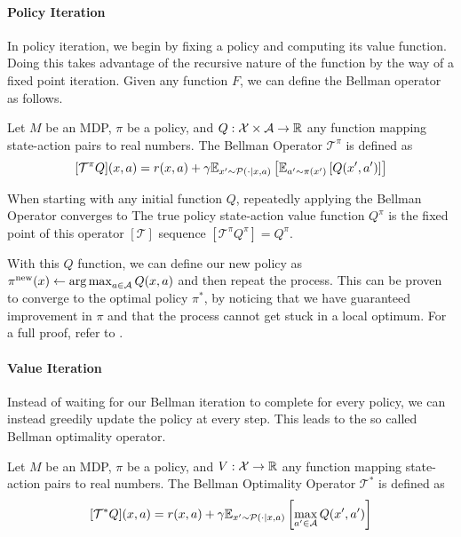 \paragraph{Policy Iteration}

In policy iteration, we begin by fixing a policy and computing its value function.
Doing this takes advantage of the recursive nature of the function by the way of a fixed point iteration.
Given any function $F$, we can define the Bellman operator as follows.

\begin{definition}
    Let $M$ be an MDP, $\pi$ be a policy, and $Q: \mathcal{X} \times \mathcal{A} \rightarrow \mathbb{R}$ any function mapping state-action pairs to real numbers.
    The Bellman Operator $\mathcal{T}^\pi$ is defined as
    $$[\mathcal{T}^\pi Q](x,a) = r(x,a) + \gamma \mathbb{E}_{x'\sim \mathcal{P}(\cdot|x,a)}\left[\mathbb{E}_{a'\sim\pi(x')}\left[Q(x',a')\right]\right]$$
\end{definition}

When starting with any initial function $Q$, repeatedly applying the Bellman Operator converges to 
The true policy state-action value function $Q^\pi$ is the fixed point of this operator $[\mathcal{T}]$ sequence $[\mathcal{T}^\pi Q^\pi] = Q^\pi$.

With this $Q$ function, we can define our new policy as $\pi^\mathrm{new}(x) \leftarrow \operatorname*{arg\,max}_{a\in\mathcal{A}} Q(x,a)$ and then repeat the process.
This can be proven to converge to the optimal policy $\pi^*$, by noticing that we have guaranteed improvement in $\pi$ and that the process cannot get stuck in a local optimum.
For a full proof, refer to \textcite{Farahmand2021}.

\paragraph{Value Iteration}

Instead of waiting for our Bellman iteration to complete for every policy, we can instead greedily update the policy at every step.
This leads to the so called Bellman optimality operator.

\begin{definition}
    Let $M$ be an MDP, $\pi$ be a policy, and $V: \mathcal{X} \rightarrow \mathbb{R}$ any function mapping state-action pairs to real numbers.
    The Bellman Optimality Operator $\mathcal{T}^*$ is defined as
    $$[\mathcal{T}^* Q](x,a) = r(x,a) + \gamma \mathbb{E}_{x'\sim \mathcal{P}(\cdot|x,a)}\left[\max_{a' \in \mathcal{A}}Q(x',a')\right]$$
\end{definition}

